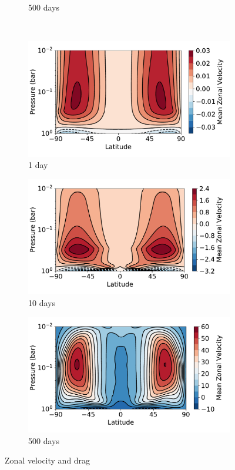 \begin{figure}
\begin{subfigure}[t]{0.32\textwidth}
    \caption{500 days}
  \end{subfigure}
  \\
  \begin{subfigure}[t]{0.32\textwidth}
    \includegraphics[width=\textwidth]{figures/eqm-zonal-flow/axi_1_u.pdf}
    \caption{1 day}
  \end{subfigure}
  \begin{subfigure}[t]{0.32\textwidth}
    \includegraphics[width=\textwidth]{figures/eqm-zonal-flow/axi_10_u.pdf}
    \caption{10 days}
  \end{subfigure}
  \begin{subfigure}[t]{0.32\textwidth}
    \includegraphics[width=\textwidth]{figures/eqm-zonal-flow/axi_500_u.pdf}
    \caption{500 days}
  \end{subfigure}
  \caption{Zonal velocity and drag}
  \label{fig:default-gcm-velocity-drag}
\end{figure}


